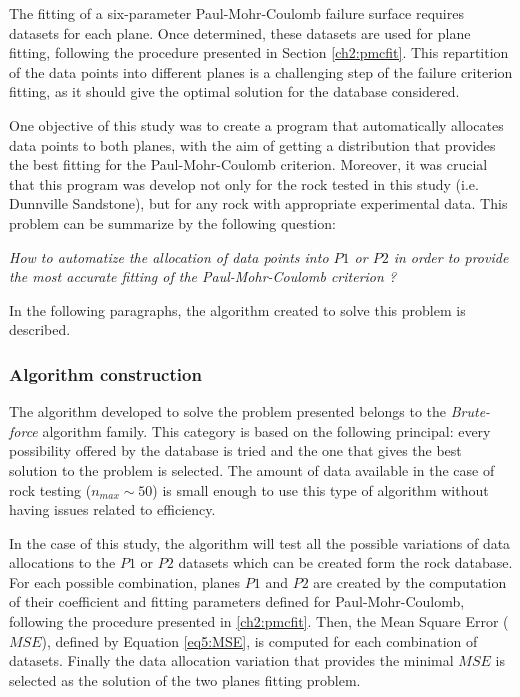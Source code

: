 The fitting of a six-parameter Paul-Mohr-Coulomb failure surface requires datasets for each plane. Once determined, these datasets are used for plane fitting, following the procedure presented in Section \ref{ch2:pmcfit}. This repartition of the data points into different planes is a challenging step of the failure criterion fitting, as it should give the optimal solution for the database considered. 

One objective of this study was to create a program that automatically allocates data points to both planes, with the aim of getting a distribution that provides the best fitting for the Paul-Mohr-Coulomb criterion. Moreover, it was crucial that this program was develop not only for the rock tested in this study (i.e. Dunnville Sandstone), but for any rock with appropriate experimental data. This problem can be summarize by the following question:
\begin{center}
    \emph{How to automatize the allocation of data points into $P1$ or $P2$ in order to provide the most accurate fitting of the Paul-Mohr-Coulomb criterion ?}
\end{center}
In the following paragraphs, the algorithm created to solve this problem is described.

\subsubsection{Algorithm construction}

The algorithm developed to solve the problem presented belongs to the \emph{Brute-force} algorithm family. This category is based on the following principal: every possibility offered by the database is tried and the one that gives the best solution to the problem is selected. The amount of data available in the case of rock testing ($n_{max}\sim 50$) is small enough to use this type of algorithm without having issues related to efficiency. 

In the case of this study, the algorithm will test all the possible variations of data allocations to the $P1$ or $P2$ datasets which can be created form the rock database. For each possible combination, planes $P1$ and $P2$ are created by the computation of their coefficient and fitting parameters defined for Paul-Mohr-Coulomb, following the procedure presented in \ref{ch2:pmcfit}. Then, the Mean Square Error ($MSE$), defined by Equation \ref{eq5:MSE}, is computed for each combination of datasets. Finally the data allocation variation that provides the minimal $MSE$ is selected as the solution of the two planes fitting problem.  

